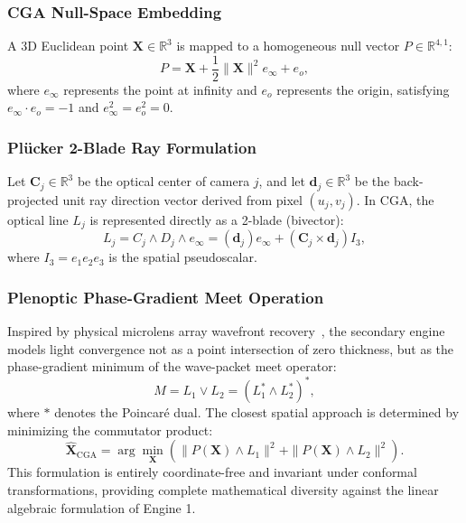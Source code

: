 \documentclass[journal]{IEEEtran}
\begin{document}
\subsubsection{CGA Null-Space Embedding}
A 3D Euclidean point $\mathbf{X} \in \mathbb{R}^3$ is mapped to a homogeneous null vector $P \in \mathbb{R}^{4,1}$:
\begin{equation}
P = \mathbf{X} + \frac{1}{2} \|\mathbf{X}\|^2 e_\infty + e_o,
\end{equation}
where $e_\infty$ represents the point at infinity and $e_o$ represents the origin, satisfying $e_\infty \cdot e_o = -1$ and $e_\infty^2 = e_o^2 = 0$.

\subsubsection{Plücker 2-Blade Ray Formulation}
Let $\mathbf{C}_j \in \mathbb{R}^3$ be the optical center of camera $j$, and let $\mathbf{d}_j \in \mathbb{R}^3$ be the back-projected unit ray direction vector derived from pixel $(u_j, v_j)$. In CGA, the optical line $L_j$ is represented directly as a 2-blade (bivector):
\begin{equation}
L_j = C_j \wedge D_j \wedge e_\infty = (\mathbf{d}_j) e_\infty + (\mathbf{C}_j \times \mathbf{d}_j) I_3,
\end{equation}
where $I_3 = e_1 e_2 e_3$ is the spatial pseudoscalar.

\subsubsection{Plenoptic Phase-Gradient Meet Operation}
Inspired by physical microlens array wavefront recovery~\cite{ng2005light}, the secondary engine models light convergence not as a point intersection of zero thickness, but as the phase-gradient minimum of the wave-packet meet operator:
\begin{equation}
M = L_1 \vee L_2 = (L_1^* \wedge L_2^*)^*,
\end{equation}
where $*$ denotes the Poincaré dual. The closest spatial approach is determined by minimizing the commutator product:
\begin{equation}
\hat{\mathbf{X}}_{\mathrm{CGA}} = \arg\min_{\mathbf{X}} \left( \|P(\mathbf{X}) \wedge L_1\|^2 + \|P(\mathbf{X}) \wedge L_2\|^2 \right).
\end{equation}
This formulation is entirely coordinate-free and invariant under conformal transformations, providing complete mathematical diversity against the linear algebraic formulation of Engine 1.
\end{document}
